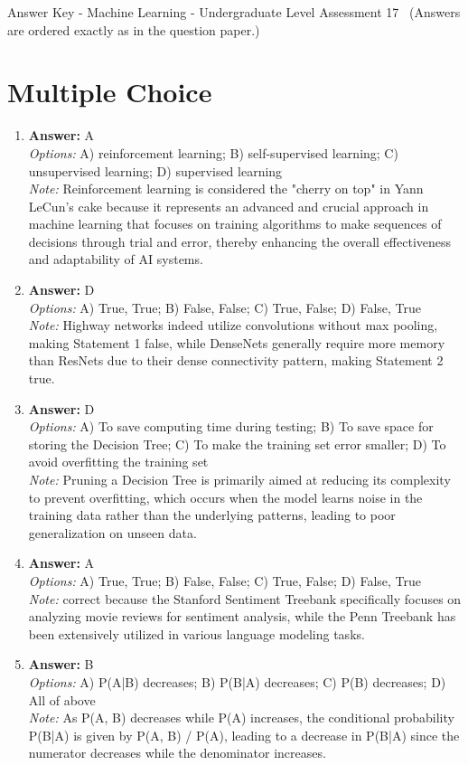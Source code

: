 \documentclass[12pt]{article}
\begin{document}
\begin{center}
Answer Key - Machine Learning - Undergraduate Level Assessment 17 \
\small (Answers are ordered exactly as in the question paper.)
\end{center}

\section*{Multiple Choice}
\begin{enumerate}[label=\arabic*.]
\item \textbf{Answer:} A
\\ \textit{Options:} A) reinforcement learning; B) self-supervised learning; C) unsupervised learning; D) supervised learning
\\ \textit{Note:} Reinforcement learning is considered the "cherry on top" in Yann LeCun's cake because it represents an advanced and crucial approach in machine learning that focuses on training algorithms to make sequences of decisions through trial and error, thereby enhancing the overall effectiveness and adaptability of AI systems.
\item \textbf{Answer:} D
\\ \textit{Options:} A) True, True; B) False, False; C) True, False; D) False, True
\\ \textit{Note:} Highway networks indeed utilize convolutions without max pooling, making Statement 1 false, while DenseNets generally require more memory than ResNets due to their dense connectivity pattern, making Statement 2 true.
\item \textbf{Answer:} D
\\ \textit{Options:} A) To save computing time during testing; B) To save space for storing the Decision Tree; C) To make the training set error smaller; D) To avoid overfitting the training set
\\ \textit{Note:} Pruning a Decision Tree is primarily aimed at reducing its complexity to prevent overfitting, which occurs when the model learns noise in the training data rather than the underlying patterns, leading to poor generalization on unseen data.
\item \textbf{Answer:} A
\\ \textit{Options:} A) True, True; B) False, False; C) True, False; D) False, True
\\ \textit{Note:} correct because the Stanford Sentiment Treebank specifically focuses on analyzing movie reviews for sentiment analysis, while the Penn Treebank has been extensively utilized in various language modeling tasks.
\item \textbf{Answer:} B
\\ \textit{Options:} A) P(A|B) decreases; B) P(B|A) decreases; C) P(B) decreases; D) All of above
\\ \textit{Note:} As P(A, B) decreases while P(A) increases, the conditional probability P(B|A) is given by P(A, B) / P(A), leading to a decrease in P(B|A) since the numerator decreases while the denominator increases.
\end{enumerate}
\end{document}
